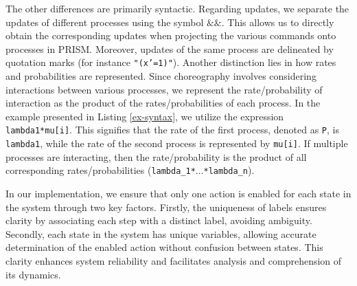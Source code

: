The other differences are primarily syntactic. Regarding updates, we separate the updates of different processes using the symbol \textcolor{sh_keyword}{$\texttt{\&\&}$}. This allows us to directly obtain the corresponding updates when projecting the various commands onto processes in PRISM. Moreover, updates of the same process are delineated by quotation marks (for instance \texttt{"(x'=1)"}). Another distinction lies in how rates and probabilities are represented. Since choreography involves considering interactions between various processes, we represent the rate/probability of interaction as the product of the rates/probabilities of each process. In the example presented in Listing \ref{ex-syntax}, we utilize the expression \texttt{lambda1*mu[i]}. This signifies that the rate of the first process, denoted as \texttt{P}, is \texttt{lambda1}, while the rate of the second process is represented by \texttt{mu[i]}. If multiple processes are interacting, then the rate/probability is the product of all corresponding rates/probabilities (\texttt{lambda\_1*$\ldots$*lambda\_n}).


In our implementation, we ensure that only one action is enabled for each state in the system through two key factors. Firstly, the uniqueness of labels ensures clarity by associating each step with a distinct label, avoiding ambiguity. Secondly, each state in the system has unique variables, allowing accurate determination of the enabled action without confusion between states. This clarity enhances system reliability and facilitates analysis and comprehension of its dynamics.